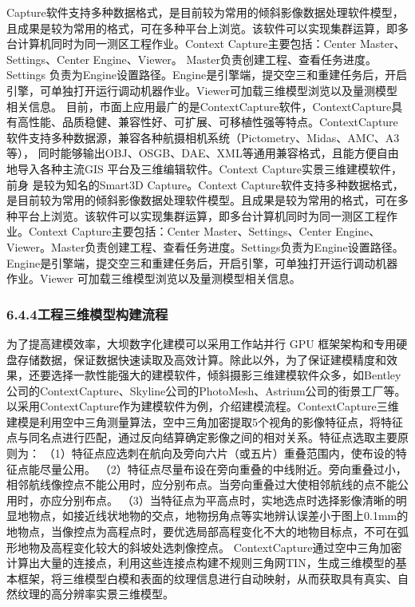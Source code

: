 Capture软件支持多种数据格式，是目前较为常用的倾斜影像数据处理软件模型，且成果是较为常用的格式，可在多种平台上浏览。该软件可以实现集群运算，即多台计算机同时为同一测区工程作业。Context Capture主要包括：Center
Master、Settings、Center Engine、Viewer。 Master负责创建工程、查看任务进度。Settings
负责为Engine设置路径。Engine是引擎端，提交空三和重建任务后，开启引擎，可单独打开运行调动机器作业。Viewer可加载三维模型浏览以及量测模型相关信息。
目前，市面上应用最广的是ContextCapture软件，ContextCapture具有高性能、品质稳健、兼容性好、可扩展、可移植性强等特点。ContextCapture软件支持多种数据源，兼容各种航摄相机系统（Pictometry、Midas、AMC、A3
等）， 同时能够输出OBJ、OSGB、DAE、XML等通用兼容格式，且能方便自由地导入各种主流GIS 平台及三维编辑软件。Context Capture实景三维建模软件，前身 是较为知名的Smart3D Capture。Context
Capture软件支持多种数据格式，是目前较为常用的倾斜影像数据处理软件模型。且成果是较为常用的格式，可在多种平台上浏览。该软件可以实现集群运算，即多台计算机同时为同一测区工程作业。Context Capture主要包括：Center
Master、Settings、Center
Engine、Viewer。Master负责创建工程、查看任务进度。Settings负责为Engine设置路径。Engine是引擎端，提交空三和重建任务后，开启引擎，可单独打开运行调动机器作业。Viewer
可加载三维模型浏览以及量测模型相关信息。 \subsubsection{6.4.4工程三维模型构建流程}\label{ux5de5ux7a0bux4e09ux7ef4ux6a21ux578bux6784ux5efaux6d41ux7a0b}
为了提高建模效率，大坝数字化建模可以采用工作站并行 GPU
框架架构和专用硬盘存储数据，保证数据快速读取及高效计算。除此以外，为了保证建模精度和效果，还要选择一款性能强大的建模软件，倾斜摄影三维建模软件众多，如Bentley公司的ContextCapture、Skyline公司的PhotoMesh、Astrium公司的街景工厂等。
以采用ContextCapture作为建模软件为例，介绍建模流程。ContextCapture三维建模是利用空中三角测量算法，空中三角加密提取5个视角的影像特征点，将特征点与同名点进行匹配，通过反向结算确定影像之间的相对关系。特征点选取主要原则为：
（1）特征点应选刺在航向及旁向六片（或五片）重叠范围内，使布设的特征点能尽量公用。 （2）特征点尽量布设在旁向重叠的中线附近。旁向重叠过小，相邻航线像控点不能公用时，应分别布点。当旁向重叠过大使相邻航线的点不能公用时，亦应分别布点。
（3）当特征点为平高点时，实地选点时选择影像清晰的明显地物点，如接近线状地物的交点，地物拐角点等实地辨认误差小于图上0.1mm的地物点，当像控点为高程点时，要优选局部高程变化不大的地物目标点，不可在弧形地物及高程变化较大的斜坡处选刺像控点。
ContextCapture通过空中三角加密计算出大量的连接点，利用这些连接点构建不规则三角网TIN，生成三维模型的基本框架，将三维模型白模和表面的纹理信息进行自动映射，从而获取具有真实、自然纹理的高分辨率实景三维模型。
